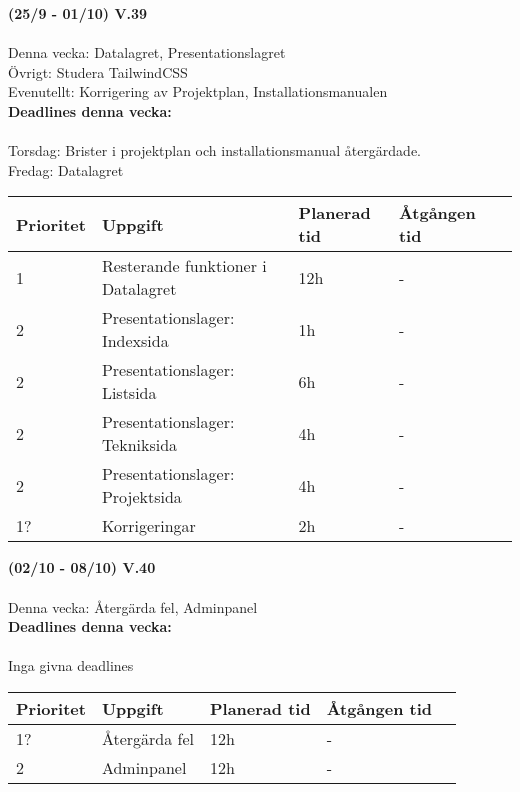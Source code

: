 \documentclass{TDP003mall}
\begin{document}
  \hrulefill

  \textbf{(25/9 - 01/10) V.39}\\\\
  Denna vecka: Datalagret, Presentationslagret\\
  Övrigt: Studera TailwindCSS\\
  Evenutellt: Korrigering av Projektplan, Installationsmanualen\\

  \textbf{Deadlines denna vecka: }\\\\
  Torsdag: Brister i projektplan och installationsmanual återgärdade.\\
  Fredag: Datalagret


\begin{table}[]
  \begin{tabular}{|l|l|l|l|l|}
  \hline
   Prioritet & Uppgift                    & Planerad tid & Åtgången tid \\ \hline
   1         & Resterande funktioner i Datalagret & 12h          & -          \\ \hline
   2        & Presentationslager: Indexsida  & 1h           & -       \\ \hline
   2        & Presentationslager: Listsida &6h          & -       \\ \hline
   2         & Presentationslager: Tekniksida & 4h          & -           \\ \hline
   2         & Presentationslager: Projektsida & 4h         & - \\ \hline
   1?    & Korrigeringar & 2h         & - \\ \hline
  \end{tabular}
  \end{table}

  \hrulefill

  
\textbf{(02/10 - 08/10) V.40}\\\\
Denna vecka: Återgärda fel, Adminpanel\\

\textbf{Deadlines denna vecka: }\\\\
Inga givna deadlines


\begin{table}[]
\begin{tabular}{|l|l|l|l|l|}
\hline
 Prioritet & Uppgift                    & Planerad tid & Åtgången tid \\ \hline
 1?        & Återgärda fel  & 12h          & -          \\ \hline
 2         & Adminpanel & 12h           & -       \\ \hline
\end{tabular}
\end{table}
\end{document}
